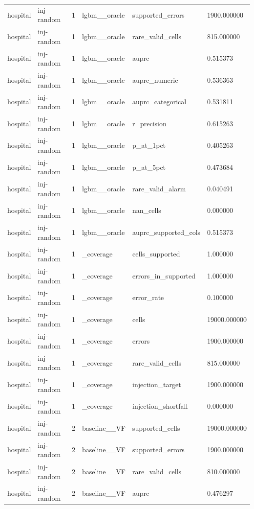 \begin{tabular}{llllll}
hospital & inj-random & 1 & lgbm\_\_oracle & supported\_errors & 1900.000000 \\
hospital & inj-random & 1 & lgbm\_\_oracle & rare\_valid\_cells & 815.000000 \\
hospital & inj-random & 1 & lgbm\_\_oracle & auprc & 0.515373 \\
hospital & inj-random & 1 & lgbm\_\_oracle & auprc\_numeric & 0.536363 \\
hospital & inj-random & 1 & lgbm\_\_oracle & auprc\_categorical & 0.531811 \\
hospital & inj-random & 1 & lgbm\_\_oracle & r\_precision & 0.615263 \\
hospital & inj-random & 1 & lgbm\_\_oracle & p\_at\_1pct & 0.405263 \\
hospital & inj-random & 1 & lgbm\_\_oracle & p\_at\_5pct & 0.473684 \\
hospital & inj-random & 1 & lgbm\_\_oracle & rare\_valid\_alarm & 0.040491 \\
hospital & inj-random & 1 & lgbm\_\_oracle & nan\_cells & 0.000000 \\
hospital & inj-random & 1 & lgbm\_\_oracle & auprc\_supported\_cols & 0.515373 \\
hospital & inj-random & 1 & \_coverage & cells\_supported & 1.000000 \\
hospital & inj-random & 1 & \_coverage & errors\_in\_supported & 1.000000 \\
hospital & inj-random & 1 & \_coverage & error\_rate & 0.100000 \\
hospital & inj-random & 1 & \_coverage & cells & 19000.000000 \\
hospital & inj-random & 1 & \_coverage & errors & 1900.000000 \\
hospital & inj-random & 1 & \_coverage & rare\_valid\_cells & 815.000000 \\
hospital & inj-random & 1 & \_coverage & injection\_target & 1900.000000 \\
hospital & inj-random & 1 & \_coverage & injection\_shortfall & 0.000000 \\
hospital & inj-random & 2 & baseline\_\_VF & supported\_cells & 19000.000000 \\
hospital & inj-random & 2 & baseline\_\_VF & supported\_errors & 1900.000000 \\
hospital & inj-random & 2 & baseline\_\_VF & rare\_valid\_cells & 810.000000 \\
hospital & inj-random & 2 & baseline\_\_VF & auprc & 0.476297 \\

\end{tabular}
